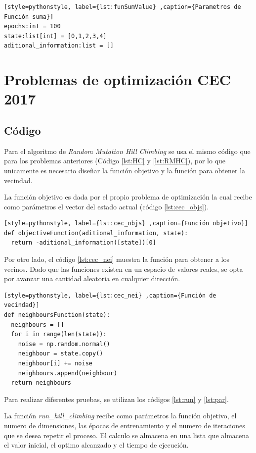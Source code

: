 \documentclass[12pt,twoside]{article}
\begin{document}
\begin{lstlisting}[style=pythonstyle, label={lst:funSumValue} ,caption={Parametros de Función suma}]
epochs:int = 100
state:list[int] = [0,1,2,3,4]
aditional_information:list = []
\end{lstlisting}

\section{Problemas de optimización CEC 2017}

\subsection{Código}

Para el algoritmo de \textit{Random Mutation Hill Climbing} se usa el mismo código que para los problemas anteriores (Código \ref{lst:HC} y \ref{lst:RMHC}), por lo que unicamente es necesario diseñar la función objetivo y la función para obtener la vecindad.

La función objetivo es dada por el propio problema de optimización la cual recibe como parámetros el vector del estado actual (código \ref{lst:cec_objs}).

\begin{lstlisting}[style=pythonstyle, label={lst:cec_objs} ,caption={Función objetivo}]
def objectiveFunction(aditional_information, state):
  return -aditional_information([state])[0]
\end{lstlisting}

Por otro lado, el código \ref{lst:cec_nei} muestra la función para obtener a los vecinos. Dado que las funciones existen en un espacio de valores reales, se opta por avanzar una cantidad aleatoria en cualquier dirección.

\begin{lstlisting}[style=pythonstyle, label={lst:cec_nei} ,caption={Función de vecindad}]
def neighboursFunction(state):
  neighbours = []
  for i in range(len(state)):
    noise = np.random.normal()
    neighbour = state.copy()
    neighbour[i] += noise
    neighbours.append(neighbour)
  return neighbours
\end{lstlisting}

Para realizar diferentes pruebas, se utilizan los códigos \ref{lst:run} y \ref{lst:par}. 

La función \textit{run\_hill\_climbing} recibe como parámetros la función objetivo, el numero de dimensiones, las épocas de entrenamiento y el numero de iteraciones que se desea repetir el proceso. El calculo se almacena en una lista que almacena el valor inicial, el optimo alcanzado y el tiempo de ejecución.
\end{document}
